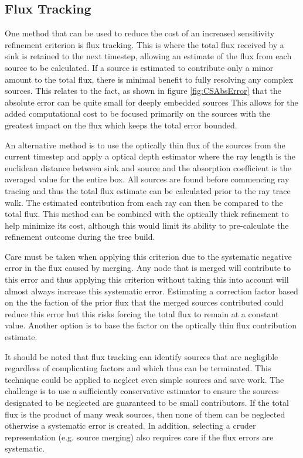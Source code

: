 \subsection{Flux Tracking}

One method that can be used to reduce the cost of an increased sensitivity refinement criterion is flux tracking. This is where the total flux received by a sink is retained to the next timestep, allowing an estimate of the flux from each source to be calculated. If a source is estimated to contribute only a minor amount to the total flux, there is minimal benefit to fully resolving any complex sources. This relates to the fact, as shown in figure \ref{fig:CSAbsError} that the absolute error can be quite small for deeply embedded sources This allows for the added computational cost to be focused primarily on the sources with the greatest impact on the flux which keeps the total error bounded.

An alternative method is to use the optically thin flux of the sources from the current timestep and apply a optical depth estimator where the ray length is the euclidean distance between sink and source and the absorption coefficient is the averaged value for the entire box. All sources are found before commencing ray tracing and thus the total flux estimate can be calculated prior to the ray trace walk. The estimated contribution from each ray can then be compared to the total flux. This method can be combined with the optically thick refinement to help minimize its cost, although this would limit its ability to pre-calculate the refinement outcome during the tree build.

Care must be taken when applying this criterion due to the systematic negative error in the flux caused by merging. Any node that is merged will contribute to this error and thus applying this criterion without taking this into account will almost always increase this systematic error. Estimating a correction factor based on the the faction of the prior flux that the merged sources contributed could reduce this error but this risks forcing the total flux to remain at a constant value. Another option is to base the factor on the optically thin flux contribution estimate.

It should be noted that flux tracking can identify sources that are negligible regardless of complicating factors and which thus can be terminated. This technique could be applied to neglect even simple sources and save work. The challenge is to use a sufficiently conservative estimator to ensure the sources designated to be neglected are guaranteed to be small contributors. If the total flux is the product of many weak sources, then none of them can be neglected otherwise a systematic error is created. In addition, selecting a cruder representation (e.g. source merging) also requires care if the flux errors are systematic.
    
